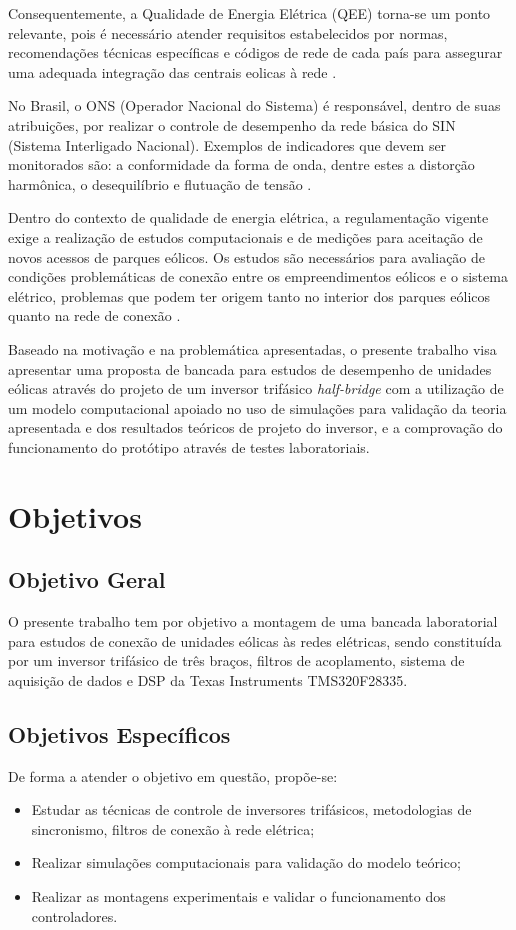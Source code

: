 Consequentemente, a Qualidade de Energia Elétrica (QEE) torna-se um ponto relevante, 
pois é necessário atender requisitos estabelecidos por normas, 
recomendações técnicas específicas e códigos de rede de cada país para assegurar 
uma adequada integração das centrais eolicas à rede \cite{DissertacaoJoao}.

No Brasil, o ONS (Operador Nacional do Sistema) é responsável, dentro de suas atribuições, por realizar o controle de desempenho da rede básica do SIN (Sistema Interligado Nacional).
Exemplos de indicadores que devem ser monitorados são: a conformidade da forma de onda, dentre estes a distorção harmônica, o desequilíbrio e flutuação de tensão \cite{DissertacaoLeandro}.

Dentro do contexto de qualidade de energia elétrica, a regulamentação vigente exige a realização de estudos computacionais e de medições para aceitação de novos acessos de parques eólicos. 
Os estudos são necessários para avaliação de condições problemáticas de conexão entre os empreendimentos eólicos e o sistema elétrico, problemas que podem ter origem tanto no interior dos parques eólicos quanto na rede de conexão \cite{DissertacaoLeandro}.

Baseado na motivação e na problemática apresentadas, o presente trabalho visa apresentar uma proposta 
de bancada para estudos de desempenho de unidades eólicas através do projeto de um inversor 
trifásico \textit{half-bridge} com a utilização de um modelo computacional apoiado no uso de simulações
para validação da teoria apresentada e dos resultados teóricos de projeto do inversor, e a comprovação 
do funcionamento do protótipo através de testes laboratoriais.

\section{Objetivos}

\subsection{Objetivo Geral}
O presente trabalho tem por objetivo a montagem de uma bancada laboratorial para estudos de conexão de unidades eólicas às redes elétricas, sendo constituída por
um inversor trifásico de três braços, filtros de acoplamento, sistema de aquisição de dados e DSP da Texas Instruments TMS320F28335.

\subsection{Objetivos Específicos}
De forma a atender o objetivo em questão, propõe-se:
\begin{itemize}
        \item Estudar as técnicas de controle de inversores trifásicos, metodologias de sincronismo, filtros de conexão à rede elétrica;
        \item Realizar simulações computacionais para validação do modelo teórico;
        \item Realizar as montagens experimentais e validar o funcionamento dos controladores.
\end{itemize}

